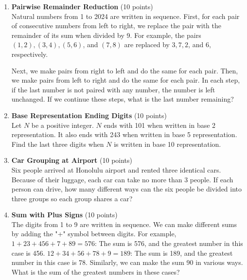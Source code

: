 \begin{enumerate}
  \item \textbf{Pairwise Remainder Reduction} (10 points)\\
  Natural numbers from 1 to 2024 are written in sequence. First, for each pair of consecutive numbers from left to right, we replace the pair with the remainder of its sum when divided by 9. For example, the pairs $(1,2),(3,4),(5,6)$, and $(7,8)$ are replaced by $3,7,2$, and $6$, respectively.

  Next, we make pairs from right to left and do the same for each pair. Then, we make pairs from left to right and do the same for each pair. In each step, if the last number is not paired with any number, the number is left unchanged. If we continue these steps, what is the last number remaining?
  \begin{subanswer}
  \end{subanswer}

  \item \textbf{Base Representation Ending Digits} (10 points)\\
  Let $N$ be a positive integer. $N$ ends with 101 when written in base 2 representation. It also ends with 243 when written in base 5 representation. Find the last three digits when $N$ is written in base 10 representation.
  \begin{subanswer}
  \end{subanswer}




  \newpage

  \item \textbf{Car Grouping at Airport} (10 points)\\
  Six people arrived at Honolulu airport and rented three identical cars. Because of their luggage, each car can take no more than 3 people. If each person can drive, how many different ways can the six people be divided into three groups so each group shares a car?
  \begin{subanswer}
  \end{subanswer}

  \item \textbf{Sum with Plus Signs} (10 points)\\
  The digits from 1 to 9 are written in sequence. We can make different sums by adding the "+" symbol between digits. For example, $1+23+456+7+89=576$: The sum is 576, and the greatest number in this case is 456. $12+34+56+78+9=189$: The sum is 189, and the greatest number in this case is 78. Similarly, we can make the sum 90 in various ways. What is the sum of the greatest numbers in these cases?
  \begin{subanswer}
  \end{subanswer}


\end{enumerate}
